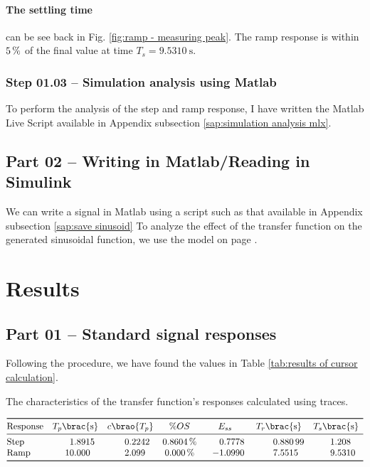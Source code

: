 \documentclass[12pt]{article}
\DeclarePairedDelimiter\brao()%
\DeclarePairedDelimiter\brac[]%
\begin{document}
\paragraph{The settling time} can be see back in Fig. \ref{fig:ramp - measuring peak}.
The ramp response is within $\SI5\percent$ of the final value at time $T_s = \SI{9.5310}\second$.

\subsubsection{Step 01.03 -- Simulation analysis using Matlab}

To perform the analysis of the step and ramp response,
I have written the Matlab Live Script available in Appendix subsection \ref{sap:simulation analysis mlx}.

\subsection{Part 02 -- Writing in Matlab/Reading in Simulink}

We can write a signal in Matlab using a script such as that available in Appendix subsection \ref{sap:save sinusoid}
To analyze the effect of the transfer function on the generated sinusoidal function,
we use the model on page \pageref{pdf:part02}.



\section{Results}

\subsection{Part 01 -- Standard signal responses}

Following the procedure, we have found the values in Table \ref{tab:results of cursor calculation}.

\begin{table}[h]
    \centering
    \caption{The characteristics of the transfer function's responses calculated using traces.}
	\[
		\begin{array}{@{}l*7S@{}}
		\toprule
			\text{Response} & T_p \brac{\si\second} & c\brao{T_p} & \si\percent OS & \text{$E_{ss}$} & T_r \brac{\si\second} & T_s \brac{\si\second}
		\\*
		\midrule
			\text{Step} & 1.8915 & 0.2242 & \SI{0.8604}\percent & 0.7778 & 0.88099 & 1.208
		\\*
			\text{Ramp} & 10.000 & 2.099 & \SI{0.000}\percent & -1.0990 & 7.5515 & 9.5310
		\\*
		\bottomrule
		\end{array}
	\]
    \label{tab:results of cursor calculation}
\end{table}
\end{document}
